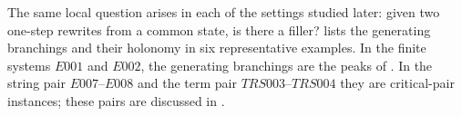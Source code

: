 The same local question arises in each of the settings studied later: given two one-step rewrites from a common state, is there a filler?  lists the generating branchings and their holonomy in six representative examples. In the finite systems $E001$ and $E002$, the generating branchings are the peaks of . In the string pair $E007$--$E008$ and the term pair $TRS003$--$TRS004$ they are critical-pair instances; these pairs are discussed in .

\begin{table}[t]
    \caption{Generating branchings in six representative examples. A filled branching carries a $2$-cell attached along the closed walk through its join witness; an open branching has nontrivial elementary holonomy and no attached cell.}
    \label{tab:elementary-holonomy-summary}
    \centering
    \smallskip
    
\end{table}
